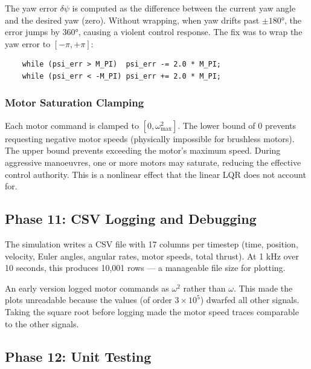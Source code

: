 \documentclass[12pt, a4paper]{article}
\begin{document}
The yaw error $\delta\psi$ is computed as the difference between the current yaw angle and the desired yaw (zero).  Without wrapping, when yaw drifts past $\pm 180°$, the error jumps by $360°$, causing a violent control response.  The fix was to wrap the yaw error to $[-\pi, +\pi]$:
\begin{verbatim}
    while (psi_err > M_PI)  psi_err -= 2.0 * M_PI;
    while (psi_err < -M_PI) psi_err += 2.0 * M_PI;
\end{verbatim}

\subsubsection{Motor Saturation Clamping}

Each motor command is clamped to $[0, \omega_{\max}^2]$.  The lower bound of 0 prevents requesting negative motor speeds (physically impossible for brushless motors).  The upper bound prevents exceeding the motor's maximum speed.  During aggressive manoeuvres, one or more motors may saturate, reducing the effective control authority.  This is a nonlinear effect that the linear LQR does not account for.

\subsection{Phase 11: CSV Logging and Debugging}

The simulation writes a CSV file with 17 columns per timestep (time, position, velocity, Euler angles, angular rates, motor speeds, total thrust).  At 1 kHz over 10 seconds, this produces 10{,}001 rows --- a manageable file size for plotting.

An early version logged motor commands as $\omega^2$ rather than $\omega$.  This made the plots unreadable because the values (of order $3 \times 10^5$) dwarfed all other signals.  Taking the square root before logging made the motor speed traces comparable to the other signals.

\subsection{Phase 12: Unit Testing}
\end{document}
